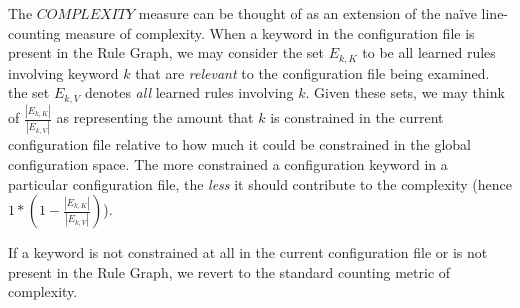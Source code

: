 
The $COMPLEXITY$ measure can be thought of as an
extension of the na\"ive line-counting measure of complexity.
When a keyword in the configuration file is present in the Rule Graph,
we may consider the set $E_{k, K}$ to be all learned rules involving
keyword $k$ that
are {\it relevant} to the configuration file being examined. the set
$E_{k, V}$ denotes {\it all} learned rules involving $k$.
Given these sets, we may think of $\frac{|E_{k, K}|}{|E_{k, V}|}$
as representing the amount that $k$ is constrained in the current
configuration file relative to how much it could be constrained
in the global configuration space. The more constrained a configuration
keyword in a particular configuration file, the {\it less} it should
contribute to the complexity (hence $1 * (1 - \frac{|E_{k, K}|}{|E_{k, V}|})$).

If a keyword is not constrained at all in the current configuration
file or is not present in the Rule Graph, we revert to the standard
counting metric of complexity.

